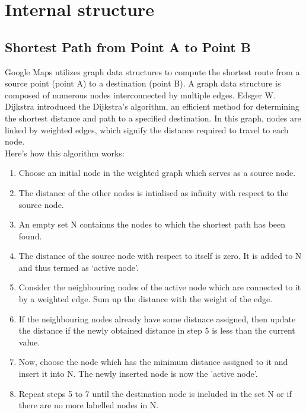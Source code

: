 \documentclass[10pt,oneside,english,a4paper]{article}
\begin{document}
\section{Internal structure} \label{internal}

\subsection{Shortest Path from Point A to Point B} \label{internal:dijikstra}
Google Maps utilizes graph data structures to compute the shortest route from a source point (point A) to a destination (point B). A graph data structure is composed of numerous nodes interconnected by multiple edges. Edsger W. Dijkstra introduced the Dijkstra's algorithm, an efficient method for determining the shortest distance and path to a specified destination. In this graph, nodes are linked by weighted edges, which signify the distance required to travel to each node. 
\\Here's how this algorithm works\cite{Mehta2019}:

\begin{enumerate}
	\item Choose an initial node in the weighted graph which serves as a source node.
	\item The distance of the other nodes is intialised as infinity with respect to the source node. 
	\item An empty set N containns the nodes to which the shortest path has been found. 
	\item The distance of the source node with respect to itself is zero. It is added to N and thus termed as ‘active node’. 
	\item Consider the neighbouring nodes of the active node which are connected to it by a weighted edge. Sum up the distance with the weight of the edge. 
	\item If the neighbouring nodes already have some distnace assigned, then update the distance if the newly obtained distance in step 5 is less than the current value. 
	\item Now, choose the node which has the minimum distance assigned to it and insert it into N. The newly inserted node is now the ’active node’. 
	\item Repeat steps 5 to 7 until the destination node is included in the set N or if there are no more labelled nodes in N.
	
\end{enumerate}
\end{document}
